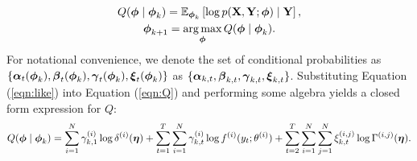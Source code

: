 \begin{gather}
    Q(\boldsymbol{\phi} \mid \boldsymbol{\phi}_{k}) = \mathbb{E}_{\boldsymbol{\phi}_{k}}\left[\log p(\mathbf{X},\mathbf{Y};\boldsymbol{\phi}) \mid \mathbf{Y} \right] \label{eqn:Q}, \\
    \boldsymbol{\phi}_{k+1} = \operatorname*{arg\,max}_{\boldsymbol{\phi}} Q(\boldsymbol{\phi} \mid \boldsymbol{\phi}_{k}). \label{eqn:BW_update}
\end{gather}
%
For notational convenience, we denote the set of conditional probabilities as $\{\boldsymbol{\alpha}_t(\boldsymbol{\phi}_k), \boldsymbol{\beta}_t(\boldsymbol{\phi}_k), \boldsymbol{\gamma}_t(\boldsymbol{\phi}_k), \boldsymbol{\xi}_t(\boldsymbol{\phi}_k)\}$ as $\{\boldsymbol{\alpha}_{k,t},\boldsymbol{\beta}_{k,t},\boldsymbol{\gamma}_{k,t},\boldsymbol{\xi}_{k,t}\}$. Substituting Equation (\ref{eqn:like}) into Equation (\ref{eqn:Q}) and performing some algebra yields a closed form expression for $Q$: %
\begin{equation}
    Q(\bfphi \mid \bfphi_{k}) %
    = \sum_{i=1}^N \gamma^{(i)}_{k,1} \log \delta^{(i)}(\bfeta) + \sum_{t = 1}^T \sum_{i=1}^N \gamma^{(i)}_{k,t} \log f^{(i)}(y_t;\theta^{(i)}) + \sum_{t=2}^{T} \sum_{i=1}^N \sum_{j=1}^N \xi^{(i,j)}_{k,t} \log \Gamma^{(i,j)}(\bfeta).
    \label{eqn:Q_sum}
\end{equation}
%

